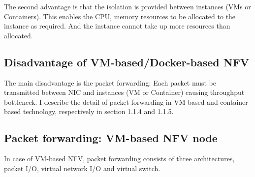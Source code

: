 The second advantage is that the isolation is provided between instances (VMs or Containers). This enables the CPU, memory resources to be allocated to the instance as required. And the instance cannot take up more resources than allocated. 

\subsection{Disadvantage of VM-based/Docker-based NFV}
The main disadvantage is the packet forwarding: Each packet must be transmitted between NIC and instances (VM or Container) causing throughput bottleneck. I describe the detail of packet forwarding in VM-based and container-based technology, respectively in section 1.1.4 and 1.1.5. 

\subsection{Packet forwarding: VM-based NFV node}
In case of VM-based NFV, packet forwarding consists of three architectures, packet I/O, virtual network I/O and virtual switch. 
